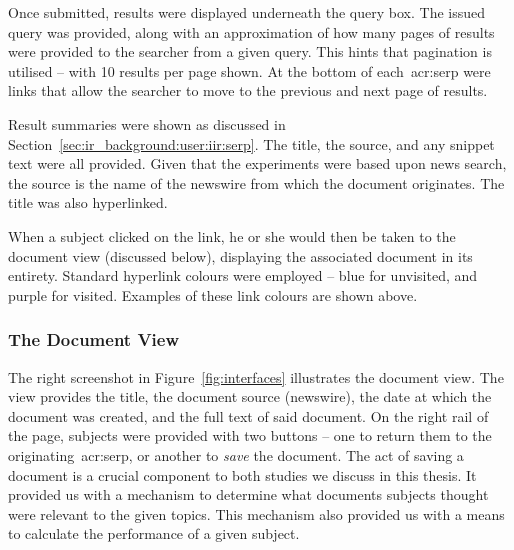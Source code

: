 Once submitted, results were displayed underneath the query box. The issued query was provided, along with an approximation of how many pages of results were provided to the searcher from a given query. This hints that pagination is utilised -- with 10 results per page shown. At the bottom of each~\gls{acr:serp} were links that allow the searcher to move to the previous and next page of results.

\begin{figure}[h]
    \centering
    \vspace{4mm}
    \label{fig:serp_buttons}
    \vspace{-5mm}
\end{figure}

Result summaries were shown as discussed in Section~\ref{sec:ir_background:user:iir:serp}. The title, the source, and any snippet text were all provided. Given that the experiments were based upon news search, the source is the name of the newswire from which the document originates. The title was also hyperlinked.

\begin{figure}[h]
    \centering
    \vspace{2mm}
    \label{fig:serp_links}
    \vspace{-10mm}
\end{figure}

When a subject clicked on the link, he or she would then be taken to the document view (discussed below), displaying the associated document in its entirety. Standard hyperlink colours were employed -- blue for unvisited, and purple for visited. Examples of these link colours are shown above.

\subsubsection{The Document View}\label{sec:methodology:user:interface:document}
The right screenshot in Figure~\ref{fig:interfaces} illustrates the document view. The view provides the title, the document source (newswire), the date at which the document was created, and the full text of said document. On the right rail of the page, subjects were provided with two buttons -- one to return them to the originating~\gls{acr:serp}, or another to \emph{save} the document. The act of saving a document is a crucial component to both studies we discuss in this thesis. It provided us with a mechanism to determine what documents subjects thought were relevant to the given topics. This mechanism also provided us with a means to calculate the performance of a given subject.

